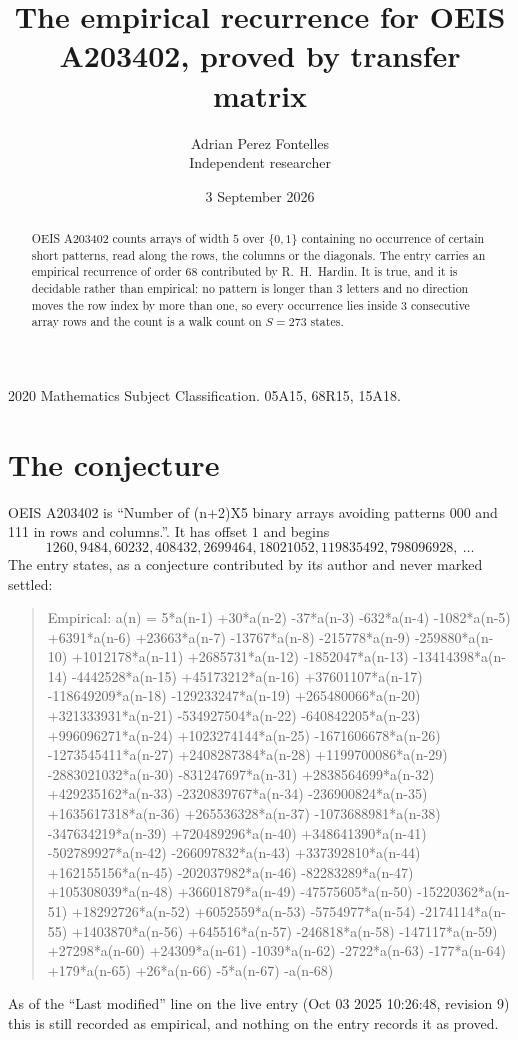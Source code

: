 \documentclass[11pt,a4paper]{article}
\title{The empirical recurrence for OEIS A203402, proved by transfer matrix}
\author{Adrian Perez Fontelles\\ \small Independent researcher}
\date{3 September 2026}
\theoremstyle{plain}
\theoremstyle{definition}
\begin{document}
\maketitle

\begin{abstract}
OEIS A203402 counts arrays of width $5$ over $\{0,1\}$ containing no occurrence of certain short
patterns, read along the rows, the columns or the diagonals. The entry carries an empirical
recurrence of order $68$ contributed by R.~H.~Hardin. It is true, and it is decidable
rather than empirical: no pattern is longer than $3$ letters and no direction moves the row
index by more than one, so every occurrence lies inside $3$ consecutive array rows and the
count is a walk count on $S=273$ states.
\end{abstract}

\noindent\small 2020 Mathematics Subject Classification. 05A15, 68R15, 15A18.\normalsize

\section{The conjecture}

OEIS A203402 is ``Number of (n+2)X5 binary arrays avoiding patterns 000 and 111 in rows and columns.''. It has offset $1$ and begins
\[
1260, 9484, 60232, 408432, 2699464, 18021052, 119835492, 798096928,\ \dots
\]
The entry states, as a conjecture contributed by its author and never marked settled:
\begin{quote}
Empirical: a(n) = 5*a(n-1) +30*a(n-2) -37*a(n-3) -632*a(n-4) -1082*a(n-5) +6391*a(n-6) +23663*a(n-7) -13767*a(n-8) -215778*a(n-9) -259880*a(n-10) +1012178*a(n-11) +2685731*a(n-12) -1852047*a(n-13) -13414398*a(n-14) -4442528*a(n-15) +45173212*a(n-16) +37601107*a(n-17) -118649209*a(n-18) -129233247*a(n-19) +265480066*a(n-20) +321333931*a(n-21) -534927504*a(n-22) -640842205*a(n-23) +996096271*a(n-24) +1023274144*a(n-25) -1671606678*a(n-26) -1273545411*a(n-27) +2408287384*a(n-28) +1199700086*a(n-29) -2883021032*a(n-30) -831247697*a(n-31) +2838564699*a(n-32) +429235162*a(n-33) -2320839767*a(n-34) -236900824*a(n-35) +1635617318*a(n-36) +265536328*a(n-37) -1073688981*a(n-38) -347634219*a(n-39) +720489296*a(n-40) +348641390*a(n-41) -502789927*a(n-42) -266097832*a(n-43) +337392810*a(n-44) +162155156*a(n-45) -202037982*a(n-46) -82283289*a(n-47) +105308039*a(n-48) +36601879*a(n-49) -47575605*a(n-50) -15220362*a(n-51) +18292726*a(n-52) +6052559*a(n-53) -5754977*a(n-54) -2174114*a(n-55) +1403870*a(n-56) +645516*a(n-57) -246818*a(n-58) -147117*a(n-59) +27298*a(n-60) +24309*a(n-61) -1039*a(n-62) -2722*a(n-63) -177*a(n-64) +179*a(n-65) +26*a(n-66) -5*a(n-67) -a(n-68)
\end{quote}
As of the ``Last modified'' line on the live entry (Oct 03 2025 10:26:48, revision 9) this is still
recorded as empirical, and nothing on the entry records it as proved.
\end{document}
